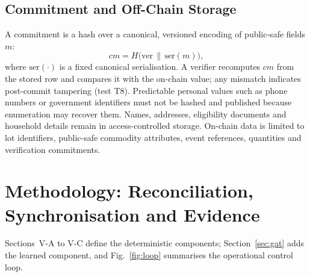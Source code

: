 \documentclass[conference,a4paper]{IEEEtran}
\begin{document}
\subsection{Commitment and Off-Chain Storage}
A commitment is a hash over a canonical, versioned encoding of public-safe fields $m$:
\begin{equation}
cm=H\big(\mathrm{ver}\,\|\,\mathrm{ser}(m)\big),
\label{eq:commit}
\end{equation}
where $\mathrm{ser}(\cdot)$ is a fixed canonical serialisation. A verifier recomputes $cm$ from the stored row and compares it with the on-chain value; any mismatch indicates post-commit tampering (test T8). Predictable personal values such as phone numbers or government identifiers must not be hashed and published because enumeration may recover them. Names, addresses, eligibility documents and household details remain in access-controlled storage. On-chain data is limited to lot identifiers, public-safe commodity attributes, event references, quantities and verification commitments.

\section{Methodology: Reconciliation, Synchronisation and Evidence}
Sections~V-A to V-C define the deterministic components; Section~\ref{sec:gat} adds the learned component, and Fig.~\ref{fig:loop} summarises the operational control loop.
\end{document}
